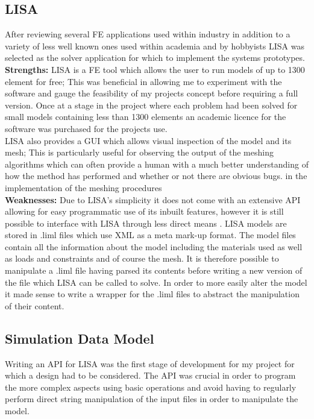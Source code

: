 \subsection{LISA}
After reviewing several FE applications used within industry in addition to a variety of less well known ones used within academia and by hobbyists LISA  was selected as the solver application for which to implement  the systems prototypes. \\ 

\noindent
\textbf{Strengths: }LISA is a FE tool which allows the user to run models of up to 1300 element for free; This was beneficial in allowing me to experiment with the software and gauge the feasibility of my projects concept before requiring a full version. Once at a stage in the project where each problem had been solved for small models containing less than 1300 elements an academic licence for the software was purchased for the projects use. \\

\noindent
LISA also provides a GUI which allows visual inspection of the model and its mesh; This is particularly useful for observing the output of the meshing algorithms which can often provide a human with a much better understanding of how the method has performed and whether or not there are obvious bugs. in the implementation of the meshing procedures \\ 

\noindent
\textbf{Weaknesses: } Due to LISA’s simplicity it does not come with an extensive API allowing for easy programmatic use of its inbuilt features, however it is still possible to interface with LISA through less direct means \cite{LISAManual}. LISA models are stored in .liml files which use XML as a meta mark-up format. The model files contain all the information about the model including the materials used as well as loads and constraints and of course the mesh. It is therefore possible to manipulate a .liml file having parsed its contents before writing a new version of the file which LISA can be called to solve. In order to more easily alter the model it made sense to write a wrapper  for the .liml files to abstract the manipulation of their content. \\ 


\subsection{Simulation Data Model}
Writing an API for LISA was the first stage of development for my project for which a design had to be considered. The API was crucial in order to program the more complex aspects using basic operations and avoid having to regularly perform direct string manipulation of the input files in order to manipulate the model. \\

